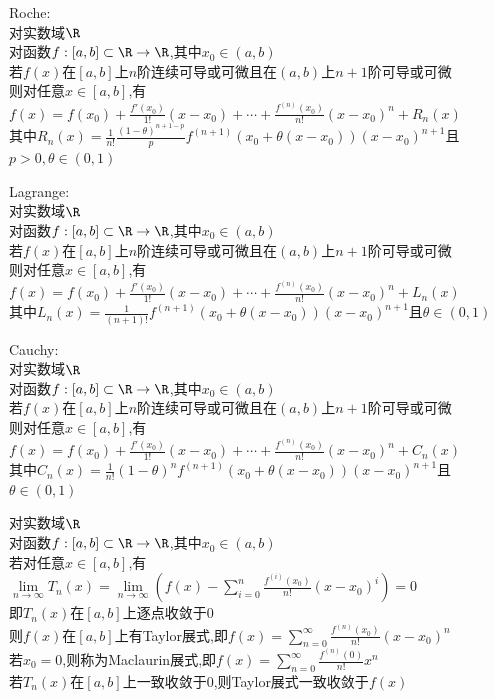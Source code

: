 \begin{dingli}
Roche:\\
对实数域$\R$\\
对函数$f:[a,b]\subset \R \to \R$,其中$x_0\in (a,b)$\\
若$f(x)$在$[a,b]$上$n$阶连续可导或可微且在$(a,b)$上$n+1$阶可导或可微\\
则对任意$x\in [a,b]$,有$f(x)=f(x_0)+\frac{f'(x_0)}{1!}(x-x_0)+\cdots+\frac{f^{(n)}(x_0)}{n!}(x-x_0)^{n}+R_n(x)$\\
其中$R_n(x)=\frac{1}{n!}\frac{(1-\theta)^{n+1-p}}{p}f^{(n+1)}(x_0+\theta(x-x_0))(x-x_0)^{n+1}$且$p>0,\theta\in (0,1)$
\end{dingli}

\begin{dingli}
Lagrange:\\
对实数域$\R$\\
对函数$f:[a,b]\subset \R \to \R$,其中$x_0\in (a,b)$\\
若$f(x)$在$[a,b]$上$n$阶连续可导或可微且在$(a,b)$上$n+1$阶可导或可微\\
则对任意$x\in [a,b]$,有$f(x)=f(x_0)+\frac{f'(x_0)}{1!}(x-x_0)+\cdots+\frac{f^{(n)}(x_0)}{n!}(x-x_0)^{n}+L_n(x)$\\
其中$L_n(x)=\frac{1}{(n+1)!}f^{(n+1)}(x_0+\theta(x-x_0))(x-x_0)^{n+1}$且$\theta\in (0,1)$
\end{dingli}

\begin{dingli}
Cauchy:\\
对实数域$\R$\\
对函数$f:[a,b]\subset \R \to \R$,其中$x_0\in (a,b)$\\
若$f(x)$在$[a,b]$上$n$阶连续可导或可微且在$(a,b)$上$n+1$阶可导或可微\\
则对任意$x\in [a,b]$,有$f(x)=f(x_0)+\frac{f'(x_0)}{1!}(x-x_0)+\cdots+\frac{f^{(n)}(x_0)}{n!}(x-x_0)^{n}+C_n(x)$\\
其中$C_n(x)=\frac{1}{n!}(1-\theta)^{n}f^{(n+1)}(x_0+\theta(x-x_0))(x-x_0)^{n+1}$且$\theta\in (0,1)$
\end{dingli}

\begin{dingyi}
对实数域$\R$\\
对函数$f:[a,b]\subset \R \to \R$,其中$x_0\in (a,b)$\\
若对任意$x\in [a,b]$,有$\lim\limits_{n\to \infty}T_n(x)=\lim\limits_{n\to\infty}(f(x)-\sum\limits_{i=0}^{n}\frac{f^{(i)}(x_0)}{n!}(x-x_0)^{i})=0$\\
即$T_n(x)$在$[a,b]$上逐点收敛于$0$\\
则$f(x)$在$[a,b]$上有Taylor展式,即$f(x)=\sum\limits_{n=0}^{\infty}\frac{f^{(n)}(x_0)}{n!}(x-x_0)^{n}$\\
若$x_0=0$,则称为Maclaurin展式,即$f(x)=\sum\limits_{n=0}^{\infty}\frac{f^{(n)}(0)}{n!}x^n$\\
若$T_n(x)$在$[a,b]$上一致收敛于$0$,则Taylor展式一致收敛于$f(x)$
\end{dingyi}

